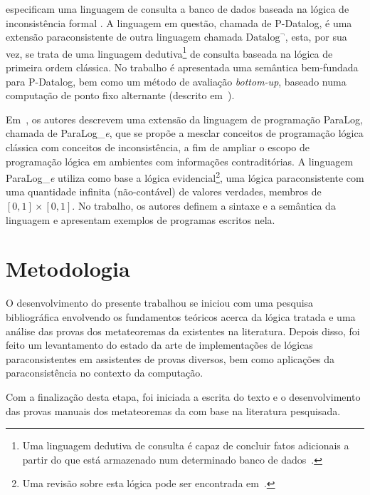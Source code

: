         
         especificam uma linguagem de consulta a banco de dados baseada na lógica de inconsistência formal \lfium{}. A linguagem em questão, chamada de P{-}Datalog, é uma extensão paraconsistente de outra linguagem chamada $\text{Datalog}^{\neg}$, esta, por sua vez, se trata de uma linguagem dedutiva\footnote{Uma linguagem dedutiva de consulta é capaz de concluir fatos adicionais a partir do que está armazenado num determinado banco de dados~\cite{datalog}.} de consulta baseada na lógica de primeira ordem clássica. No trabalho é apresentada uma semântica bem-fundada para P{-}Datalog, bem como um método de avaliação \textit{bottom{-}up}, baseado numa computação de ponto fixo alternante (descrito em~). 
        
        Em~, os autores descrevem uma extensão da linguagem de programação ParaLog, chamada de ParaLog\_\textit{e}, que se propõe a mesclar conceitos de programação lógica clássica com conceitos de inconsistência, a fim de ampliar o escopo de programação lógica em ambientes com informações contraditórias. A linguagem ParaLog\_\textit{e} utiliza como base a lógica evidencial\footnote{Uma revisão sobre esta lógica pode ser encontrada em~.}, uma lógica paraconsistente com uma quantidade infinita (não-contável) de valores verdades, membros de $[0,1] \times [0,1]$. No trabalho, os autores definem a sintaxe e a semântica da linguagem e apresentam exemplos de programas escritos nela.
    
    \section{Metodologia}\label{sec:metodologia}
      O desenvolvimento do presente trabalhou se iniciou com uma pesquisa bibliográfica envolvendo os fundamentos teóricos acerca da lógica tratada e uma análise das provas dos metateoremas da \lfium{} existentes na literatura. Depois disso, foi feito um levantamento do estado da arte de implementações de lógicas paraconsistentes em assistentes de provas diversos, bem como aplicações da paraconsistência no contexto da computação.

     Com a finalização desta etapa, foi iniciada a escrita do texto e o desenvolvimento das provas manuais dos metateoremas da \lfium{} com base na literatura pesquisada.
        

